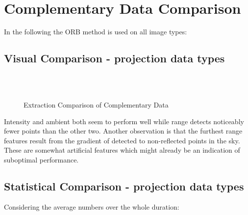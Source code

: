 \section{Complementary Data Comparison}{
    In the following the ORB method is used on all image types:
    \subsection{Visual Comparison - projection data types}{
    \begin{figure}[ht]
        \centering
        \\
        \\
        \caption{Extraction Comparison of Complementary Data}
    \end{figure}

    Intensity and ambient both seem to perform well while range detects noticeably fewer points than the other two. Another observation is that the furthest range features result from the gradient of detected to non-reflected points in the sky. These are somewhat artificial features which might already be an indication of suboptimal performance.
    }
    \subsection{Statistical Comparison - projection data types}{

    Considering the average numbers over the whole duration:

}}

